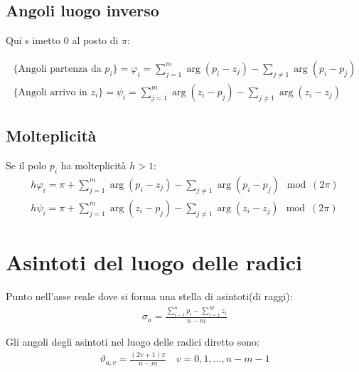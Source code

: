 \subsection{Angoli luogo inverso}
Qui s imetto 0 al posto di $\pi$:

\begin{align}
  \{ \text{Angoli partenza da $p_i$} \} = \varphi_i = \sum_{j = 1}^m \arg(p_i - z_j) - \sum_{j \neq 1} \arg(p_i - p_j) \\
  \{ \text{Angoli arrivo in $z_i$} \} = \psi_i = \sum_{j = 1}^m \arg(z_i - p_j) - \sum_{j \neq 1} \arg(z_i - z_j)
\end{align}


\subsection{Molteplicit\`a}
Se il polo $p_i$ ha molteplicit\`a $h > 1$:
\begin{align}
  h \varphi_i = \pi + \sum_{j = 1}^m \arg(p_i - z_j) - \sum_{j \neq 1} \arg(p_i - p_j) \mod(2\pi) \\
  h \psi_i = \pi + \sum_{j = 1}^m \arg(z_i - p_j) - \sum_{j \neq 1} \arg(z_i - z_j) \mod(2\pi) 
\end{align}



\section{Asintoti del luogo delle radici}
Punto nell'asse reale dove si forma una stella di asintoti(di raggi):
\begin{align}
  \sigma_a = \frac{\sum_{i-1}^n p_i - \sum_{i=1}^M z_i}{n-m}
\end{align}

Gli angoli degli asintoti nel luogo delle radici diretto sono:
\begin{align}
  \vartheta_{a, v} = \frac{(2v+1)\pi}{n-m} \quad v = 0, 1, \dots, n-m-1
\end{align}

